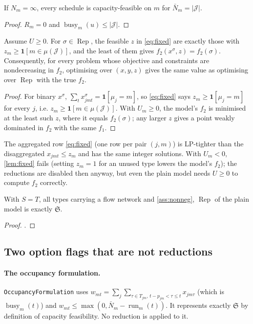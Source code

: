 \documentclass[11pt,a4paper]{article}
\newcommand{\J}{\mathcal{J}}
\newcommand{\Sched}{\mathfrak{S}}
\newcommand{\Rep}{\operatorname{Rep}}
\newcommand{\Run}{\operatorname{run}}
\newcommand{\Busy}{\operatorname{busy}}
\newcommand{\code}[1]{\texttt{#1}}
\newcommand{\ind}[1]{\mathbf{1}[#1]}
\begin{document}
\begin{lemma}\label{lem:barN}
If $N_m=\infty$, every schedule is capacity-feasible on $m$ for
$\bar N_m=|\J|$.
\end{lemma}
\begin{proof}
$R_m=0$ and $\Busy_m(u)\le|\J|$.
\end{proof}

\begin{lemma}\label{lem:fixed}
Assume $U\ge0$. For $\sigma\in\Rep$, the feasible $z$ in \eqref{eq:fixed} are
exactly those with $z_m\ge\ind{m\in\mu(\J)}$, and the least of them gives
$f_2(x^\sigma,z)=f_2(\sigma)$. Consequently, for every problem whose
objective and constraints are nondecreasing in $f_2$, optimising over
$(x,y,z)$ gives the same value as optimising over $\Rep$ with the true $f_2$.
\end{lemma}
\begin{proof}
For binary $x^\sigma$, $\sum_t x^\sigma_{jmt}=\ind{\mu_j=m}$, so
\eqref{eq:fixed} says $z_m\ge\ind{\mu_j=m}$ for every $j$, i.e.
$z_m\ge\ind{m\in\mu(\J)}$. With $U_m\ge0$, the model's $f_2$ is minimised at
the least such $z$, where it equals $f_2(\sigma)$; any larger $z$ gives a
point weakly dominated in $f_2$ with the same $f_1$.
\end{proof}

\begin{remark}
The aggregated row \eqref{eq:fixed} (one row per pair $(j,m)$) is LP-tighter
than the disaggregated $x_{jmt}\le z_m$ and has the same integer solutions.
With $U_m<0$, \cref{lem:fixed} fails (setting $z_m=1$ for an unused type
lowers the model's $f_2$); the reductions are disabled then anyway, but even
the plain model needs $U\ge0$ to compute $f_2$ correctly.
\end{remark}

\begin{corollary}
With $S=T$, all types carrying a flow network and \cref{ass:nonneg}, $\Rep$ of
the plain model is exactly $\Sched$.
\end{corollary}
\begin{proof}
.
\end{proof}

\subsection{Two option flags that are not reductions}

\paragraph{The occupancy formulation.} \code{OccupancyFormulation} uses
$w_{mt} = \sum_j\sum_{\tau\in T_{jm},\,t-p_{jm}<\tau\le t} x_{jm\tau}$ (which is
$\Busy_m(t)$) and $w_{mt}\le\max(0,\bar N_m-\Run_m(t))$. It represents
exactly $\Sched$ by definition of capacity feasibility. No reduction is
applied to it.
\end{document}
